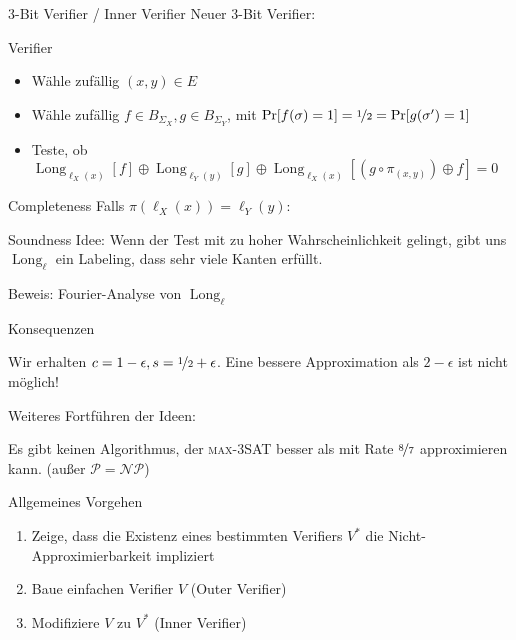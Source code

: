 \documentclass[table,german,10pt]{beamer}
\DeclareMathOperator{\longc}{Long}
\begin{document}
  \begin{frame}{3-Bit Verifier / Inner Verifier}
    Neuer 3-Bit Verifier:
    \begin{block}{Verifier}
    \begin{itemize}[<+->]
    \item Wähle zufällig $(x,y)\in E$
    \item Wähle zufällig $f\in B_{\Sigma_{X}},g\in B_{\Sigma_{Y}}$, mit
      $\Pr[f(\sigma)=1]=\nicefrac{1}{2}=\Pr[g(\sigma')=1]$
    \item Teste, ob
      $\longc_{\ell_{X}(x)}[f]\oplus \longc_{\ell_{Y}(y)}[g]\oplus \longc_{\ell_{X}(x)}[(g\circ
      \pi_{(x,y)})\oplus f]=0$
    \end{itemize}
    \end{block}

\pause
\begin{block}{Completeness}
Falls $\pi(\ell_{X}(x))=\ell_{Y}(y)$:
\pause
\begin{block}{Soundness}
Idee: Wenn der Test mit zu hoher Wahrscheinlichkeit gelingt, gibt uns
$\longc_{\ell}$ ein Labeling, dass sehr viele Kanten erfüllt.

Beweis: Fourier-Analyse von $\longc_{\ell}$

\end{block}
  
\end{block}
  \end{frame}
  \begin{frame}{Konsequenzen}

    \begin{theorem}
      Wir erhalten $c=1-\epsilon, s=\nicefrac{1}{2}+\epsilon$. Eine
      bessere Approximation als $2-\epsilon$ ist nicht möglich!
    \end{theorem}
\pause

    Weiteres Fortführen der Ideen:

    \begin{theorem}
      Es gibt keinen Algorithmus, der \textsc{max-3SAT} besser als mit
      Rate $\nicefrac{8}{7}$ approximieren kann. (außer $\mathcal{P}=\mathcal{NP}$)
    \end{theorem}
    
  \end{frame}

\begin{frame}{Allgemeines Vorgehen}
  \begin{enumerate}[<+->]
  \item Zeige, dass die Existenz eines bestimmten Verifiers $V^{*}$ die
    Nicht-Approximierbarkeit impliziert
  \item Baue einfachen Verifier $V$ (Outer Verifier)
  \item Modifiziere $V$ zu $V^{*}$ (Inner Verifier)
  \end{enumerate}
  
\end{frame}
\end{document}

